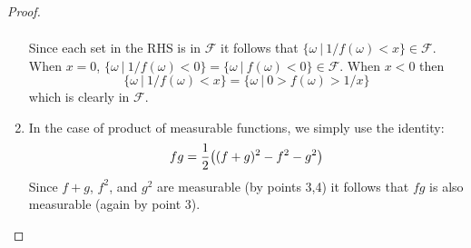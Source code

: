 \begin{proof}
\begin{enumerate}
\begin{align*}
      \end{align*}
      Since each set in the RHS is in $ \mathscr{F}$ it follows that $\{\omega\ |\ 1/f(\omega) < x\}\in \mathscr{F}$. When $x=0$, $\{\omega\ |\ 1/f(\omega) < 0\} = \{\omega\ |\ f(\omega) < 0\} \in \mathscr{F}$. When $x<0$ then
      \[\{\omega\ |\ 1/f(\omega) < x\} = \{\omega\ |\ 0>f(\omega) > 1/x\} \]
      which is clearly in $ \mathscr{F}$.\\
    \item In the case of product of measurable functions, we simply use the identity:
      \[fg = \frac{1}{2} \big((f+g)^2 - f^2 - g^2\big)\]
      Since $f+g$, $f^2$, and $g^2$ are measurable (by points 3,4) it follows that $fg$ is also measurable (again by point 3).
  \end{enumerate} 
\end{proof}
